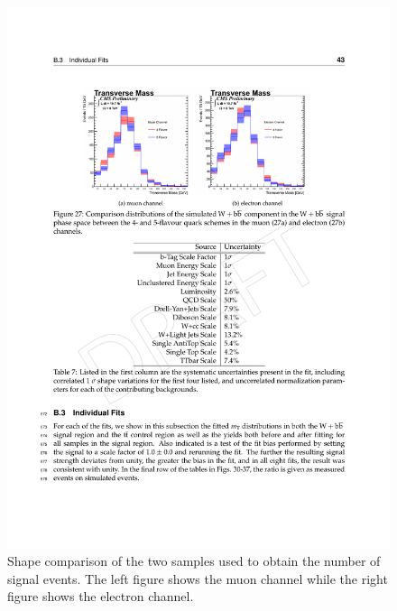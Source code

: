 \begin{figure}[htbp]
	\centering
		\includegraphics[width=\textwidth]{Figures/4fsvs5fs.pdf}
	\caption[Comparison of the two W+bb samples used to obtain the number of signal events.]{Shape comparison of the two samples used to obtain the number of signal events. The left figure shows the muon channel while the right figure shows the electron channel.}
	\label{fig:4fsvs5fs}
\end{figure}


